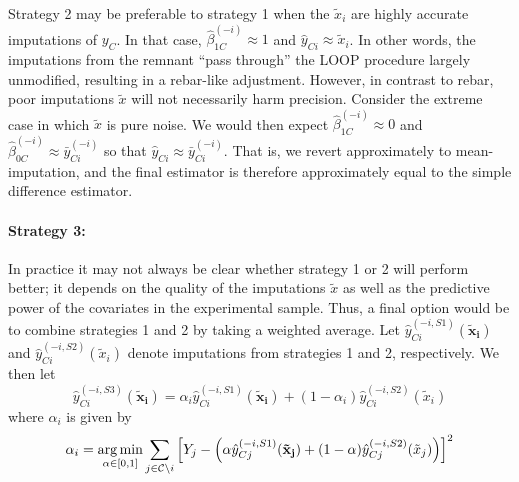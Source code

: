 Strategy 2 may be preferable to strategy 1 when the $\tilde{x}_{i}$ are highly accurate imputations of $y_C$.  In that case, $\hat{\beta}_{1C}^{(-i)} \approx 1$
and $\hat{y}_{Ci} \approx \tilde{x}_{i}$.  In other words, the imputations from the remnant ``pass through'' the LOOP procedure largely unmodified, resulting in a rebar-like adjustment.  However, in contrast to rebar, poor imputations $\tilde{x}$ will not necessarily harm precision.  Consider the extreme case in which $\tilde{x}$ is pure noise.  We would then expect $\hat{\beta}_{1C}^{(-i)} \approx 0$ and $\hat{\beta}_{0C}^{(-i)} \approx \bar{y}^{(-i)}_{Ci}$ so that $\hat{y}_{Ci} \approx \bar{y}^{(-i)}_{Ci}$.  That is, we revert approximately to mean-imputation, and the final estimator is therefore approximately equal to the simple difference estimator.

\paragraph{Strategy 3:}

In practice it may not always be clear whether strategy 1 or 2 will perform better; it depends on the quality of the imputations $\tilde{x}$ as well as the predictive power of the covariates in the experimental sample.  Thus, a final option would be to combine strategies 1 and 2 by taking a weighted average.  Let $\hat{y}^{(-i, S1)}_{Ci}(\mathbf{\tilde{x}_i})$ and $\hat{y}^{(-i, S2)}_{Ci}(\tilde{x}_i)$ denote imputations from strategies 1 and 2, respectively.  We then let
\begin{equation}
\hat{y}^{(-i, S3)}_{Ci}(\mathbf{\tilde{x}_i}) = \alpha_i \hat{y}^{(-i, S1)}_{Ci}(\mathbf{\tilde{x}_i}) + (1-\alpha_i) \hat{y}^{(-i, S2)}_{Ci}(\tilde{x}_i)
\end{equation}
where $\alpha_i$ is given by
\begin{equation}
\alpha_i = \operatorname*{arg\,min}_{\alpha \in [0,1]} \sum_{j \in \mathcal{C} \setminus i} \left[Y_j - \left(\alpha \hat{y}^{(-i, S1)}_{Cj}(\mathbf{\tilde{x}_j}) + (1-\alpha) \hat{y}^{(-i, S2)}_{Cj}(\tilde{x}_j) \right)\right]^2
\end{equation}






